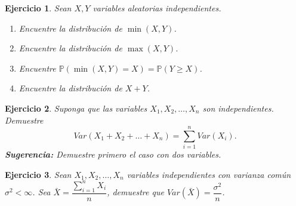 \documentclass[11pt]{report}
\theoremstyle{break}
\newtheorem{ejercicio}{Ejercicio}[chapter]
\theoremstyle{break}
\begin{document}
\begin{ejercicio}
Sean $X,Y$ variables aleatorias independientes.
\begin{enumerate}[label=\alph*)]
\item Encuentre la distribución de $\min(X,Y)$.
\item Encuentre la distribución de $\max(X,Y)$.
\item Encuentre $\mathbb{P}(\min(X,Y) = X) = \mathbb{P}(Y \geq X)$.
\item Encuentre la distribución de $X + Y$.
\end{enumerate}
\end{ejercicio}

\begin{ejercicio}
Suponga que las variables $X_1, X_2, \ldots, X_n$ son independientes. Demuestre
$$
Var(X_1 + X_2 + \ldots + X_n) = \sum_{i=1}^{n}Var(X_i).
$$
\textbf{Sugerencia:} Demuestre primero el caso con dos variables.
\end{ejercicio}

\begin{ejercicio}
Sean $X_1, X_2, \ldots, X_n$ variables independientes con varianza común $\sigma^2 < \infty$. Sea $\bar{X} = \dfrac{\sum_{i=1}^{n} X_i }{n}$, demuestre que $Var(\bar{X}) = \dfrac{\sigma^2}{n}$.
\end{ejercicio}

\end{document}
